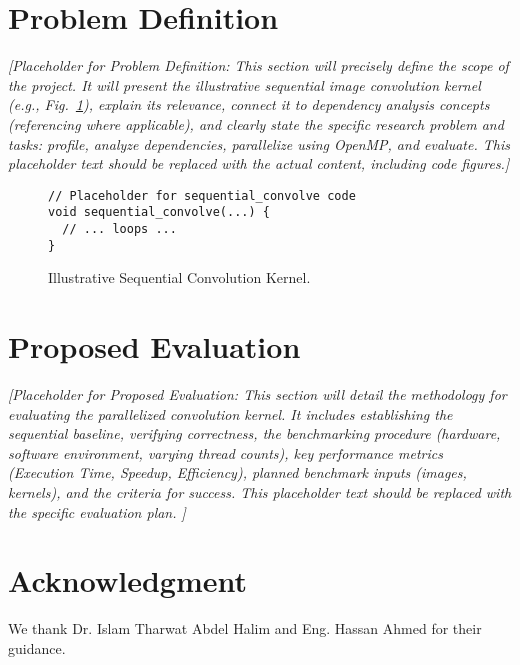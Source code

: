 \documentclass[conference, 10pt]{IEEEtran}
\begin{document}
\section{Problem Definition}
\textit{{\color{blue} %
[Placeholder for Problem Definition: This section will precisely define the scope of the project. It will present the illustrative sequential image convolution kernel (e.g., Fig.~\ref{fig:seq_code}), explain its relevance, connect it to dependency analysis concepts (referencing \cite{idkfactchecking2025} where applicable), and clearly state the specific research problem and tasks: profile, analyze dependencies, parallelize using OpenMP, and evaluate. This placeholder text should be replaced with the actual content, including code figures.]
}}

\begin{figure}[htbp]
\begin{verbatim}
// Placeholder for sequential_convolve code
void sequential_convolve(...) {
  // ... loops ...
}
\end{verbatim}
\caption{Illustrative Sequential Convolution Kernel.}
\label{fig:seq_code}
\end{figure}


\section{Proposed Evaluation}
\textit{{\color{blue} %
[Placeholder for Proposed Evaluation: This section will detail the methodology for evaluating the parallelized convolution kernel. It includes establishing the sequential baseline, verifying correctness, the benchmarking procedure (hardware, software environment, varying thread counts), key performance metrics (Execution Time, Speedup, Efficiency), planned benchmark inputs (images, kernels), and the criteria for success. This placeholder text should be replaced with the specific evaluation plan.
\cite{hbdscientific2025}]
}}







\section*{Acknowledgment} 
We thank Dr. Islam Tharwat Abdel Halim and Eng. Hassan Ahmed for their guidance.


 
\end{document}
